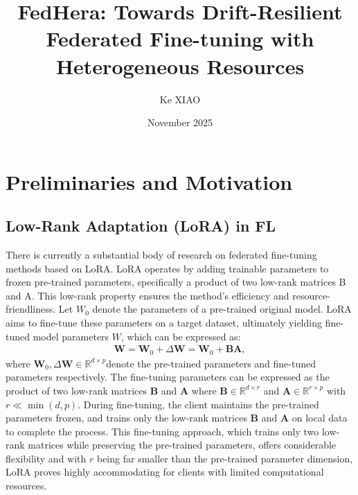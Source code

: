 \documentclass{article}
\title{FedHera: Towards Drift-Resilient Federated Fine-tuning with Heterogeneous Resources}
\author{Ke XIAO}
\date{November 2025}
\begin{document}
\maketitle
\section{Preliminaries and Motivation}
\subsection{Low-Rank Adaptation (LoRA) in FL}
There is currently a substantial body of research on federated fine-tuning methods based on LoRA. LoRA operates by adding trainable parameters to frozen pre-trained parameters, specifically a product of two low-rank matrices B and A. This low-rank property ensures the method's efficiency and resource-friendliness. Let $W_{0}$ denote the parameters of a pre-trained original model. LoRA aims to fine-tune these parameters on a target dataset, ultimately yielding fine-tuned model parameters $W$, which can be expressed as:
\begin{align}
    \mathbf{W} = \mathbf{W}_{0} + \Delta \mathbf{W} = \mathbf{W}_{0} + \mathbf{B}\mathbf{A},
\end{align}
where $\mathbf{W}_{0}, \Delta \mathbf{W} \in \mathbb{R}^{d \times p}$denote the pre-trained parameters and fine-tuned parameters respectively. The fine-tuning parameters can be expressed as the product of two low-rank matrices $\mathbf{B}$ and $\mathbf{A}$ where $\mathbf{B} \in \mathbb{R}^{d \times r} $ and $ \mathbf{A} \in \mathbb{R}^{r \times p}$ with $r \ll \min (d, p)$. During fine-tuning, the client maintains the pre-trained parameters frozen, and trains only the low-rank matrices $\mathbf{B}$ and $\mathbf{A}$ on local data to complete the process. This fine-tuning approach, which trains only two low-rank matrices while preserving the pre-trained parameters, offers considerable flexibility and with $r$ being far smaller than the pre-trained parameter dimension, LoRA proves highly accommodating for clients with limited computational resources.
\end{document}
